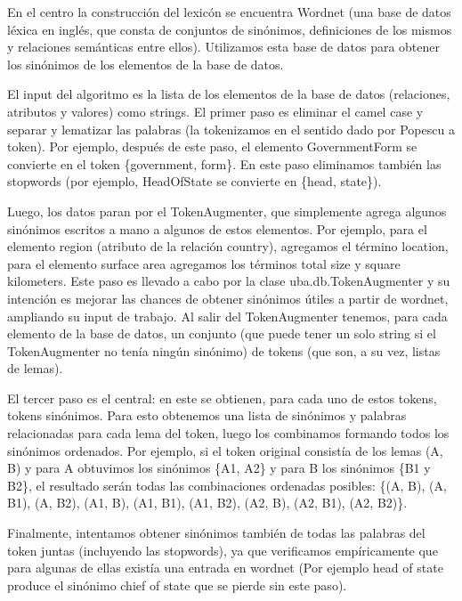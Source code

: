 En el centro la construcción del lexicón se encuentra Wordnet (una base de datos léxica en inglés, que consta de conjuntos de sinónimos, definiciones de los mismos y relaciones semánticas entre ellos). Utilizamos esta base de datos para obtener los sinónimos de los elementos de la base de datos.

El input del algoritmo es la lista de los elementos de la base de datos (relaciones, atributos y valores) como strings. El primer paso es eliminar el camel case y separar y lematizar las palabras (la tokenizamos en el sentido dado por Popescu a token). Por ejemplo, después de este paso, el elemento GovernmentForm se convierte en el token \{government, form\}. En este paso eliminamos también las stopwords (por ejemplo, HeadOfState se convierte en \{head, state\}).

Luego, los datos paran por el TokenAugmenter, que simplemente agrega algunos sinónimos escritos a mano a algunos de estos elementos. Por ejemplo, para el elemento region (atributo de la relación country), agregamos el término location, para el elemento surface area agregamos los términos total size y square kilometers. Este paso es llevado a cabo por la clase uba.db.TokenAugmenter y su intención es mejorar las chances de obtener sinónimos útiles a partir de wordnet, ampliando su input de trabajo. Al salir del TokenAugmenter tenemos, para cada elemento de la base de datos, un conjunto (que puede tener un solo string si el TokenAugmenter no tenía ningún sinónimo) de tokens (que son, a su vez, listas de lemas).


El tercer paso es el central: en este se obtienen, para cada uno de estos tokens, tokens sinónimos. Para esto obtenemos una lista de sinónimos y palabras relacionadas para cada lema del token, luego los combinamos formando todos los sinónimos ordenados. Por ejemplo, si el token original consistía de los lemas (A, B) y para A obtuvimos los sinónimos \{A1, A2\} y para B los sinónimos \{B1 y B2\}, el resultado serán todas las combinaciones ordenadas posibles: \{(A, B), (A, B1), (A, B2), (A1, B), (A1, B1), (A1, B2), (A2, B), (A2, B1), (A2, B2)\}.

Finalmente, intentamos obtener sinónimos también de todas las palabras del token juntas (incluyendo las stopwords), ya que verificamos empíricamente que para algunas de ellas existía una entrada en wordnet (Por ejemplo head of state produce el sinónimo chief of state que se pierde sin este paso).


